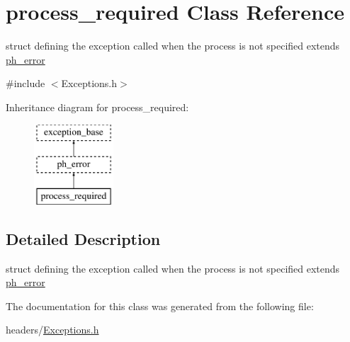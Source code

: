 \hypertarget{structprocess__required}{\section{process\-\_\-required \-Class \-Reference}
\label{structprocess__required}
}


struct defining the exception called when the process is not specified extends \hyperlink{structph__error}{ph\-\_\-error}  




{\ttfamily \#include $<$\-Exceptions.\-h$>$}

\-Inheritance diagram for process\-\_\-required\-:\begin{figure}[H]
\begin{center}
\leavevmode
\includegraphics[height=3.000000cm]{structprocess__required}
\end{center}
\end{figure}


\subsection{\-Detailed \-Description}
struct defining the exception called when the process is not specified extends \hyperlink{structph__error}{ph\-\_\-error} 

\-The documentation for this class was generated from the following file\-:\begin{DoxyCompactItemize}
\item 
headers/\hyperlink{_exceptions_8h}{\-Exceptions.\-h}\end{DoxyCompactItemize}
